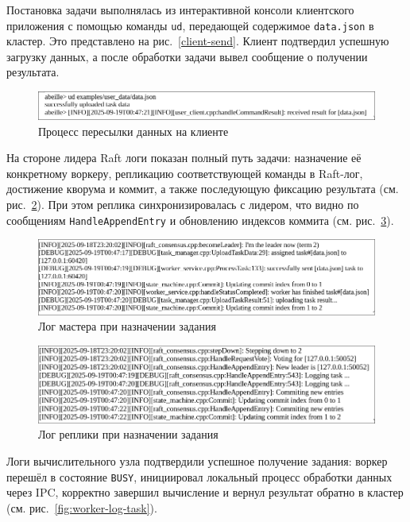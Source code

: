 Постановка задачи выполнялась из интерактивной консоли клиентского приложения с
помощью команды \texttt{ud}, передающей содержимое \texttt{data.json} в
кластер. Это представлено на рис.~\ref{client-send}. Клиент подтвердил успешную
загрузку данных, а после обработки задачи вывел сообщение о получении
результата.

\begin{figure}[h!]
    \centering
    \includegraphics[width=0.8\linewidth]{inc/client-send.png}
    \caption{Процесс пересылки данных на клиенте}
    \label{fig:client-send}
\end{figure}

На стороне лидера Raft логи показан полный путь задачи: назначение её
конкретному воркеру, репликацию соответствующей команды в Raft-лог, достижение
кворума и коммит, а также последующую фиксацию результата (см.
рис.~\ref{fig:master-log-task}). При этом реплика синхронизировалась с лидером,
что видно по сообщениям \texttt{HandleAppendEntry} и обновлению индексов
коммита (см. рис.~\ref{fig:replica-log-task}).

\begin{figure}[h!]
    \centering
    \includegraphics[width=0.8\linewidth]{inc/master-log-task.png}
    \caption{Лог мастера при назначении задания}
    \label{fig:master-log-task}
\end{figure}

\begin{figure}[h!]
    \centering
    \includegraphics[width=0.8\linewidth]{inc/replica-log-task.png}
    \caption{Лог реплики при назначении задания}
    \label{fig:replica-log-task}
\end{figure}

Логи вычислительного узла подтвердили успешное получение задания: воркер перешёл
в состояние \texttt{BUSY}, инициировал локальный процесс обработки данных
через IPC, корректно завершил вычисление и вернул результат обратно в кластер
(см. рис.~\ref{fig:worker-log-task}).

